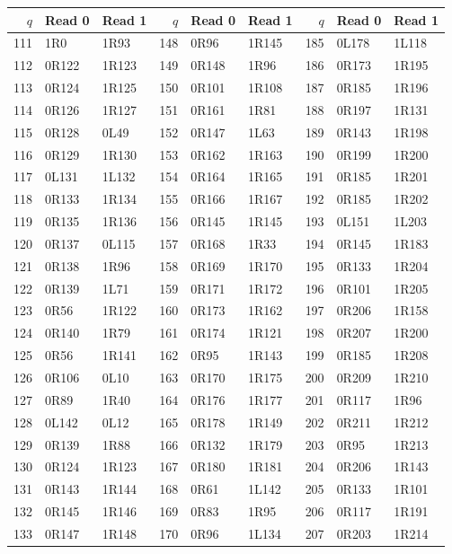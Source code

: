 \begin{center}
\begin{tabular}{rll@{\qquad}rll@{\qquad}rll}
\toprule
$q$ & Read 0 & Read 1 & $q$ & Read 0 & Read 1 & $q$ & Read 0 & Read 1\\
\midrule
111 & 1R0 & 1R93 & 148 & 0R96 & 1R145 & 185 & 0L178 & 1L118\\
112 & 0R122 & 1R123 & 149 & 0R148 & 1R96 & 186 & 0R173 & 1R195\\
113 & 0R124 & 1R125 & 150 & 0R101 & 1R108 & 187 & 0R185 & 1R196\\
114 & 0R126 & 1R127 & 151 & 0R161 & 1R81 & 188 & 0R197 & 1R131\\
115 & 0R128 & 0L49 & 152 & 0R147 & 1L63 & 189 & 0R143 & 1R198\\
116 & 0R129 & 1R130 & 153 & 0R162 & 1R163 & 190 & 0R199 & 1R200\\
117 & 0L131 & 1L132 & 154 & 0R164 & 1R165 & 191 & 0R185 & 1R201\\
118 & 0R133 & 1R134 & 155 & 0R166 & 1R167 & 192 & 0R185 & 1R202\\
119 & 0R135 & 1R136 & 156 & 0R145 & 1R145 & 193 & 0L151 & 1L203\\
120 & 0R137 & 0L115 & 157 & 0R168 & 1R33 & 194 & 0R145 & 1R183\\
121 & 0R138 & 1R96 & 158 & 0R169 & 1R170 & 195 & 0R133 & 1R204\\
122 & 0R139 & 1L71 & 159 & 0R171 & 1R172 & 196 & 0R101 & 1R205\\
123 & 0R56 & 1R122 & 160 & 0R173 & 1R162 & 197 & 0R206 & 1R158\\
124 & 0R140 & 1R79 & 161 & 0R174 & 1R121 & 198 & 0R207 & 1R200\\
125 & 0R56 & 1R141 & 162 & 0R95 & 1R143 & 199 & 0R185 & 1R208\\
126 & 0R106 & 0L10 & 163 & 0R170 & 1R175 & 200 & 0R209 & 1R210\\
127 & 0R89 & 1R40 & 164 & 0R176 & 1R177 & 201 & 0R117 & 1R96\\
128 & 0L142 & 0L12 & 165 & 0R178 & 1R149 & 202 & 0R211 & 1R212\\
129 & 0R139 & 1R88 & 166 & 0R132 & 1R179 & 203 & 0R95 & 1R213\\
130 & 0R124 & 1R123 & 167 & 0R180 & 1R181 & 204 & 0R206 & 1R143\\
131 & 0R143 & 1R144 & 168 & 0R61 & 1L142 & 205 & 0R133 & 1R101\\
132 & 0R145 & 1R146 & 169 & 0R83 & 1R95 & 206 & 0R117 & 1R191\\
133 & 0R147 & 1R148 & 170 & 0R96 & 1L134 & 207 & 0R203 & 1R214\\

\end{tabular}
\end{center}

